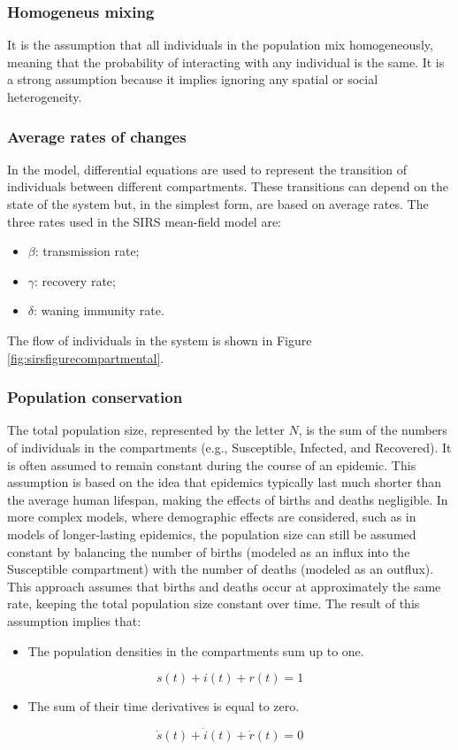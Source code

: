 \subsubsection{Homogeneus mixing} 
It is the assumption that all individuals in the population mix homogeneously, meaning that the probability of interacting with any individual is the same. It is a strong assumption because it implies ignoring any spatial or social heterogeneity.
\subsubsection{Average rates of changes}
\label{sec:sir_presentation}
In the model, differential equations are used to represent the transition of individuals between different compartments. These transitions can depend on the state of the system but, in the simplest form, are based on average rates. The three rates used in the SIRS mean-field model are:
\begin{itemize}
	\item $\beta$: transmission rate;
	\item $\gamma$: recovery rate;
	\item $\delta$: waning immunity rate.
\end{itemize}
The flow of individuals in the system is shown in Figure \ref{fig:sirsfigurecompartmental}.

\subsubsection{Population conservation}
The total population size, represented by the letter $N$, is the sum of the numbers of individuals in the compartments (e.g., Susceptible, Infected, and Recovered). It is often assumed to remain constant during the course of an epidemic. This assumption is based on the idea that epidemics typically last much shorter than the average human lifespan, making the effects of births and deaths negligible.
In more complex models, where demographic effects are considered, such as in models of longer-lasting epidemics, the population size can still be assumed constant by balancing the number of births (modeled as an influx into the Susceptible compartment) with the number of deaths (modeled as an outflux). This approach assumes that births and deaths occur at approximately the same rate, keeping the total population size constant over time. The result of this assumption implies that:
\begin{itemize}
	\item The population densities in the compartments sum up to one.
\end{itemize}
\[s(t) + i(t) + r(t)= 1 \]
\begin{itemize}
	\item The sum of their time derivatives is equal to zero.
\end{itemize}
 \[\dot{s}(t)+ \dot{i}(t) + \dot{r}(t)= 0\]

